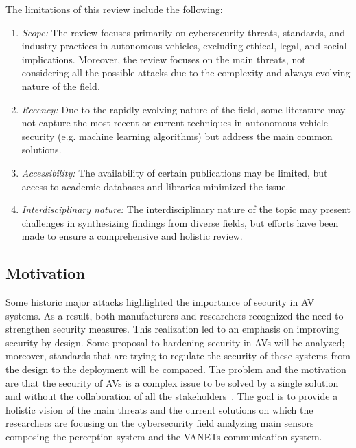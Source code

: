 The limitations of this review include the following:
\begin{enumerate}
    \item \textit{Scope:} The review focuses primarily on cybersecurity threats, standards, and industry practices in autonomous vehicles, excluding ethical, legal, and social implications.
    Moreover, the review focuses on the main threats, not considering all the possible attacks due to the complexity and always evolving nature of the field.
    \item \textit{Recency:} Due to the rapidly evolving nature of the field, some literature may not capture the most recent or current techniques in autonomous vehicle security (e.g. machine learning algorithms) but address the main common solutions.
    \item \textit{Accessibility:} The availability of certain publications may be limited, but access to academic databases and libraries minimized the issue.
    \item \textit{Interdisciplinary nature:} The interdisciplinary nature of the topic may present challenges in synthesizing findings from diverse fields, but efforts have been made to ensure a comprehensive and holistic review.
\end{enumerate}

\subsection{Motivation}\label{subsec:motivation}

Some historic major attacks highlighted the importance of security in AV systems.
As a result, both manufacturers and researchers recognized the need to strengthen security measures.
This realization led to an emphasis on improving security by design.
Some proposal to hardening security in AVs will be analyzed; moreover, standards that are trying to regulate the security of these systems from the design to the deployment will be compared.
The problem and the motivation are that the security of AVs is a complex issue to be solved by a single solution and without the collaboration of all the stakeholders~\cite{comparison-standard}.
The goal is to provide a holistic vision of the main threats and the current solutions on which the researchers are focusing on the cybersecurity field
analyzing main sensors composing the perception system and the VANETs communication system.

\newpage
